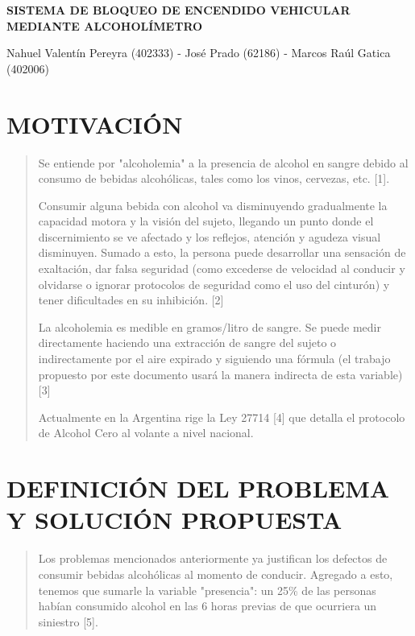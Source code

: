 \documentclass[a4paper,11pt]{article}
\title{}
\author{}
\date{}
\begin{document}
	
	\begin{center}
		\textbf{\fontsize{15pt}{17pt}\selectfont  SISTEMA DE BLOQUEO DE ENCENDIDO VEHICULAR MEDIANTE ALCOHOLÍMETRO}
		
		
		Nahuel Valentín Pereyra (402333) - José Prado (62186) - Marcos Raúl Gatica (402006)
		
	\end{center}
	
	\begin{multicols}{2}
		
		\section{MOTIVACIÓN}
		\begin{quotation}
			Se entiende por "alcoholemia" a la presencia de alcohol en sangre debido al consumo de bebidas alcohólicas, tales como los vinos, cervezas, etc. [1]. 
			
			Consumir alguna bebida con alcohol va disminuyendo gradualmente la capacidad motora y la visión del sujeto, llegando un punto donde el discernimiento se ve afectado y los reflejos, atención y agudeza visual disminuyen. Sumado a esto, la persona puede desarrollar una sensación de exaltación, dar falsa seguridad (como excederse de velocidad al conducir y olvidarse o ignorar protocolos de seguridad como el uso del cinturón) y tener dificultades en su inhibición. [2]
			
			La alcoholemia es medible en gramos/litro de sangre. Se puede medir directamente haciendo una extracción de sangre del sujeto o indirectamente por el aire expirado y siguiendo una fórmula (el trabajo propuesto por este documento usará la manera indirecta de esta variable) [3]
			
			Actualmente en la Argentina rige la Ley 27714 [4] que detalla el protocolo de Alcohol Cero al volante a nivel nacional.
			
		\end{quotation}	
		
		\section{DEFINICIÓN DEL PROBLEMA \newline Y SOLUCIÓN PROPUESTA}
		\begin{quotation}
			Los problemas mencionados anteriormente ya justifican los defectos de consumir bebidas alcohólicas al momento de conducir. Agregado a esto, tenemos que sumarle la variable "presencia": un 25\% de las personas habían consumido alcohol en las 6 horas previas de que ocurriera un siniestro [5].  
			

\end{quotation}
\end{multicols}
\end{document}
